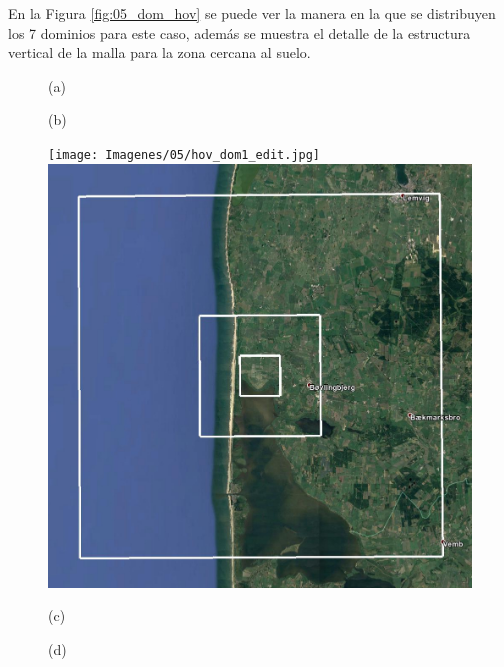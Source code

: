 En la Figura \ref{fig:05_dom_hov} se puede ver la manera en la que se distribuyen los 7 dominios para este caso, además se muestra el detalle de la estructura vertical de la malla para la zona cercana al suelo.

\begin{figure}[H]
	\centering
	\begin{minipage}{0.5\linewidth}
		\center(a)
	\end{minipage}%
	\begin{minipage}{0.5\linewidth}
		\center(b)
	\end{minipage}%
	
	\texttt{[image: Imagenes/05/hov\_dom1\_edit.jpg]}\hspace{0.5cm}%
	\includegraphics[width=0.45\linewidth,trim={0cm 0cm 0cm 0cm},clip,frame]{Imagenes/05/hov_dom2_edit.jpg}\vspace{0.3cm}%
	
	\begin{minipage}{0.5\linewidth}
		\center \hspace{1.5cm}(c)
	\end{minipage}%
	\begin{minipage}{0.5\linewidth}
		\center(d)
	\end{minipage}%
	

\end{figure}

